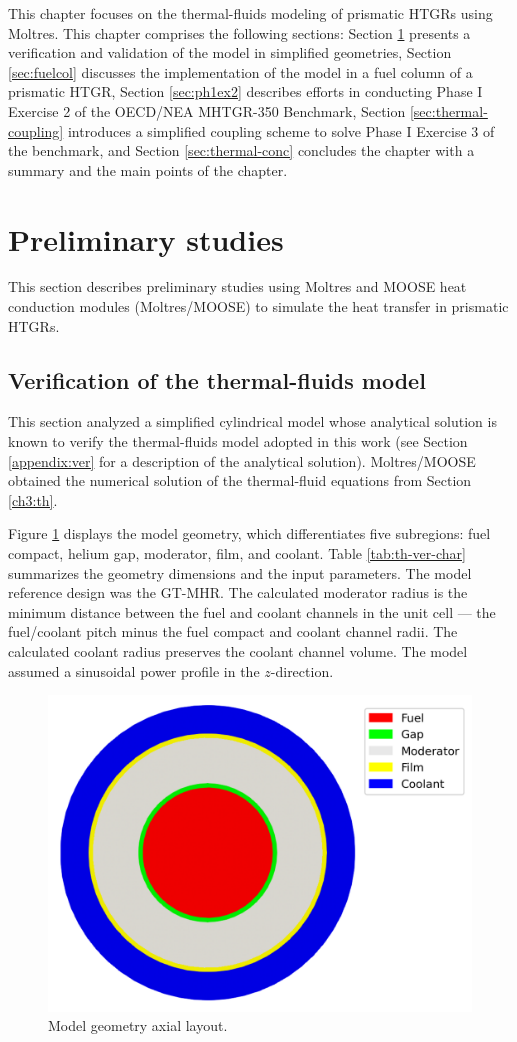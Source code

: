 \label{ch:thermalfluids}

This chapter focuses on the thermal-fluids modeling of prismatic HTGRs using Moltres.
This chapter comprises the following sections: 
Section \ref{sec:thermal-prelim} presents a verification and validation of the model in simplified geometries,
Section \ref{sec:fuelcol} discusses the implementation of the model in a fuel column of a prismatic HTGR,
Section \ref{sec:ph1ex2} describes efforts in conducting Phase I Exercise 2 of the OECD/NEA MHTGR-350 Benchmark, 
Section \ref{sec:thermal-coupling} introduces a simplified coupling scheme to solve Phase I Exercise 3 of the benchmark,
and Section \ref{sec:thermal-conc} concludes the chapter with a summary and the main points of the chapter.

\section{Preliminary studies}
\label{sec:thermal-prelim}

This section describes preliminary studies using Moltres and MOOSE heat conduction modules (Moltres/MOOSE) to simulate the heat transfer in prismatic HTGRs.

\subsection{Verification of the thermal-fluids model}
\label{sec:tf-ver}

This section analyzed a simplified cylindrical model whose analytical solution is known to verify the thermal-fluids model adopted in this work (see Section \ref{appendix:ver} for a description of the analytical solution).
Moltres/MOOSE obtained the numerical solution of the thermal-fluid equations from Section \ref{ch3:th}.

Figure \ref{fig:th-ver-mesh} displays the model geometry, which differentiates five subregions: fuel compact, helium gap, moderator, film, and coolant.
Table \ref{tab:th-ver-char} summarizes the geometry dimensions and the input parameters.
The model reference design was the GT-MHR.
The calculated moderator radius is the minimum distance between the fuel and coolant channels in the unit cell --- the fuel/coolant pitch minus the fuel compact and coolant channel radii.
The calculated coolant radius preserves the coolant channel volume.
The model assumed a sinusoidal power profile in the $z$-direction.

\begin{figure}[htbp!]
	\centering
	\includegraphics[width=0.50\linewidth]{figures-thermal/ver-mesh2}
	\hfill
	\caption{Model geometry axial layout.}
	\label{fig:th-ver-mesh}
\end{figure}

